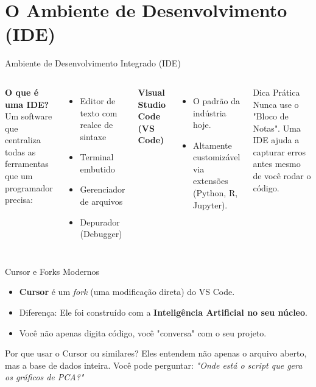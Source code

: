 \section{O Ambiente de Desenvolvimento (IDE)}

\begin{frame}{Ambiente de Desenvolvimento Integrado (IDE)}
\begin{columns}
\textbf{O que é uma IDE?} \\
Um software que centraliza todas as ferramentas que um programador precisa:
\begin{itemize}
    \item Editor de texto com realce de sintaxe
    \item Terminal embutido
    \item Gerenciador de arquivos
    \item Depurador (Debugger)
\end{itemize}

\vspace{0.3cm}
\textbf{Visual Studio Code (VS Code)}
\begin{itemize}
    \item O padrão da indústria hoje.
    \item Altamente customizável via extensões (Python, R, Jupyter).
\end{itemize}

\begin{exampleblock}{Dica Prática}
Nunca use o "Bloco de Notas". Uma IDE ajuda a capturar erros antes mesmo de você rodar o código.
\end{exampleblock}
\end{columns}
\end{frame}

\begin{frame}{Cursor e Forks Modernos}
\begin{itemize}
    \item \textbf{Cursor} é um \textit{fork} (uma modificação direta) do VS Code.
    \item Diferença: Ele foi construído com a \textbf{Inteligência Artificial no seu núcleo}.
    \item Você não apenas digita código, você "conversa" com o seu projeto.
\end{itemize}

\vspace{0.5cm}
\begin{block}{Por que usar o Cursor ou similares?}
Eles entendem não apenas o arquivo aberto, mas a base de dados inteira. Você pode perguntar: \textit{"Onde está o script que gera os gráficos de PCA?"}
\end{block}
\end{frame}

